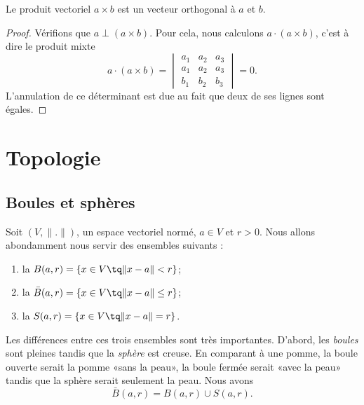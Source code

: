 \begin{proposition}
    Le produit vectoriel $a\times b$ est un vecteur orthogonal à $a$ et $b$.
\end{proposition}

\begin{proof}
    Vérifions que $a\perp (a\times b)$. Pour cela, nous calculons $a\cdot (a\times b)$, c'est à dire le produit mixte
    \begin{equation}
        a\cdot(a\times b)=\begin{vmatrix}
            a_1    &   a_2    &   a_3    \\
            a_1    &   a_2    &   a_3    \\
            b_1    &   b_2    &   b_3
        \end{vmatrix}=0.
    \end{equation}
    L'annulation de ce déterminant est due au fait que deux de ses lignes sont égales.
\end{proof}

\section{Topologie}

\subsection{Boules et sphères}

\begin{definition}
	Soit $(V,\| . \|)$, un espace vectoriel normé, $a\in V$ et $r>0$. Nous allons abondamment nous servir des ensembles suivants :
	\begin{enumerate}

		\item
			la  $B(a,r)=\{ x\in V\tq \| x-a \|<r \}$;
		\item
			la  $\bar B(a,r)=\{ x\in V\tq \| x-a \|\leq r \}$;
		\item
			la  $S(a,r)=\{ x\in V\tq \| x-a \|=r \}$.

	\end{enumerate}
\end{definition}
Les différences entre ces trois ensembles sont très importantes. D'abord, les \emph{boules} sont pleines tandis que la \emph{sphère} est creuse. En comparant à une pomme, la boule ouverte serait la pomme «sans la peau», la boule fermée serait «avec la peau» tandis que la sphère serait seulement la peau. Nous avons
\begin{equation}
	\bar B(a,r)=B(a,r)\cup S(a,r).
\end{equation}

